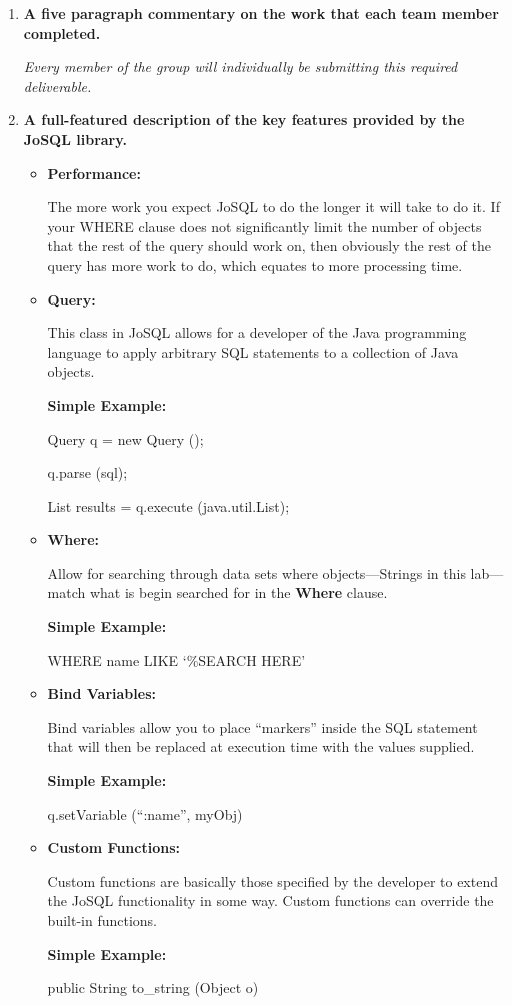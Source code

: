\begin{enumerate}
	\item \textbf{A five paragraph commentary on the work that each team member completed.}\par
		\textit{Every member of the group will individually be submitting this required
			deliverable.}
	\item \textbf{A full-featured description of the key features provided by the JoSQL library.}\par
		\begin{itemize}

			\item \textbf{Performance: }\par
				The more work you expect JoSQL to do the longer it will take to do it.
				If your WHERE clause does not significantly limit the number of objects
				that the rest of the query should work on, then obviously the rest
				of the query has more work to do, which equates to more processing time.

			\item \textbf{Query: }\par 
				This class in JoSQL allows for a developer of the Java programming language
				to apply arbitrary SQL statements to a collection of Java objects.

				\begin{center}
					\textbf{Simple Example: }\par
					Query q = new Query ();\par
					q.parse (sql);\par
					List results = q.execute (java.util.List);
				\end{center}

			\item \textbf{Where: }\par
				Allow for searching through data sets where objects---Strings
				in this lab---match what is begin searched for
				in the \textbf{Where} clause.
				\begin{center}
					\textbf{Simple Example: }\par
					WHERE  name LIKE `\%SEARCH HERE'
				\end{center}

			\item \textbf{Bind Variables: }\par
				Bind variables allow you to place ``markers'' inside the SQL 
				statement that will then be replaced at execution time with the values supplied.
				\begin{center}
					\textbf{Simple Example: }\par
					q.setVariable (``:name'', myObj)
				\end{center}
			\item \textbf{Custom Functions: }\par
				Custom functions are basically those specified by the developer
				to extend the JoSQL functionality in some way. 
				Custom functions can override the built-in functions.
				\begin{center}
					\textbf{Simple Example: }\par
					public String to\_string (Object o)
					\medskip


\end{center}
\end{itemize}
\end{enumerate}
